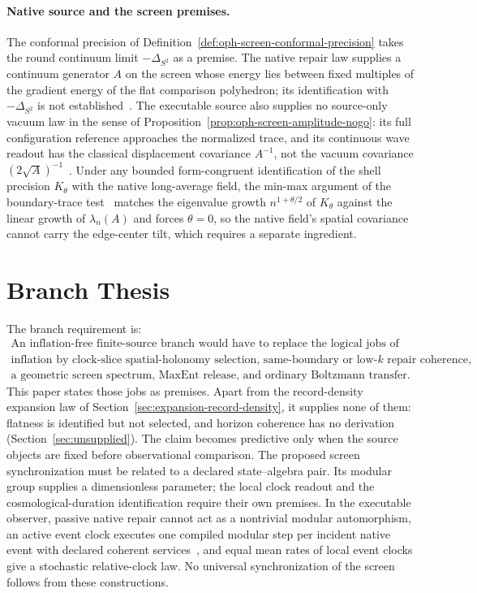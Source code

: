 \documentclass[11pt]{article}
\theoremstyle{remark}
\theoremstyle{plain}
\begin{document}


\paragraph{Native source and the screen premises.}
The conformal precision of
Definition~\ref{def:oph-screen-conformal-precision} takes the round
continuum limit \(-\Delta_{S^2}\) as a premise. The native repair law
supplies a continuum generator \(A\) on the screen whose energy lies between
fixed multiples of the gradient energy of the flat comparison polyhedron;
its identification with \(-\Delta_{S^2}\) is not
established~\cite{ophcontinuum}. The executable source also supplies no
source-only vacuum law in the sense of
Proposition~\ref{prop:oph-screen-amplitude-nogo}: its full configuration
reference approaches the normalized trace, and its continuous wave readout
has the classical displacement covariance \(A^{-1}\), not the vacuum
covariance \((2\sqrt A)^{-1}\)~\cite{ophtimefields}. Under any bounded
form-congruent identification of the shell precision \(K_\theta\) with the
native long-average field, the min-max argument of the boundary-trace
test~\cite{ophcontinuum} matches the eigenvalue growth \(n^{1+\theta/2}\)
of \(K_\theta\) against the linear growth of \(\lambda_n(A)\) and forces
\(\theta=0\), so the native field's spatial covariance cannot carry the
edge-center tilt, which requires a separate ingredient.

\section{Branch Thesis}

The branch requirement is:
\[
\boxed{
\begin{gathered}
\text{An inflation-free finite-source branch would have to replace the logical jobs of}\\
\text{inflation by clock-slice spatial-holonomy selection, same-boundary or low-}k\text{ repair coherence,}\\
\text{a geometric screen spectrum, MaxEnt release, and ordinary Boltzmann transfer.}
\end{gathered}}
\]
This paper states those jobs as premises. Apart from the record-density
expansion law of Section~\ref{sec:expansion-record-density}, it supplies
none of them: flatness is identified but not selected, and horizon coherence
has no derivation (Section~\ref{sec:unsupplied}). The claim becomes
predictive only when the source objects are fixed before observational
comparison. The proposed screen synchronization must be related to a
declared state--algebra pair. Its modular group supplies a dimensionless
parameter; the local clock readout and the cosmological-duration
identification require their own premises. In the executable observer,
passive native repair cannot act as a nontrivial modular automorphism, an
active event clock executes one compiled modular step per incident native
event with declared coherent services~\cite{ophmodel}, and equal mean rates
of local event clocks give a stochastic relative-clock law. No universal
synchronization of the screen follows from these constructions.
\end{document}
